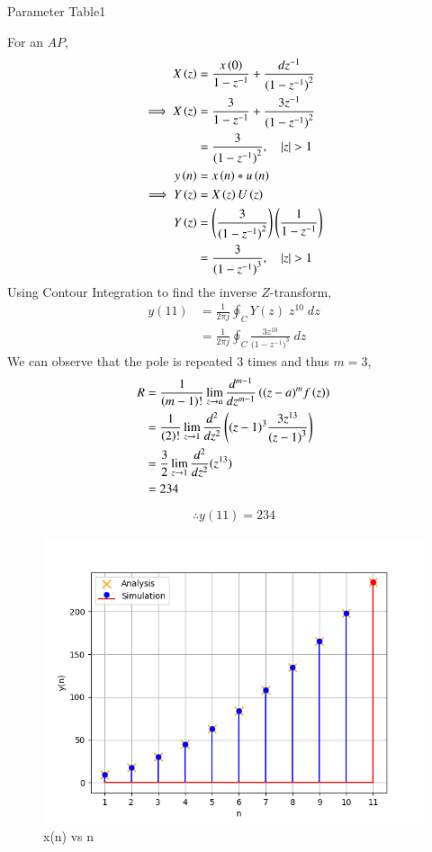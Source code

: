 \documentclass[journal,12pt,twocolumn]{IEEEtran}
\begin{document}
	\begin{table}[ht]
		\centering
		\def\arraystretch{1.5}
		
		\caption{Parameter Table1}
		\label{tab:10.5.3.1}
	\end{table}
	For an $AP$,
	\begin{align}
		X\left(z\right) &= \frac{ x\left(0\right) }{1-z^{-1}} + \frac{dz^{-1}}{{(1-z^{-1})}^{2}}    \\
		\implies X\left(z\right) &= \frac{3}{1-z^{-1}} + \frac{3z^{-1}}{{(1-z^{-1})}^{2}} \\
		&= \frac{3}{({1-z^{-1})}^{2}} ,\quad \left\vert z\right\vert>1    \\
		y\left(n\right)&=x\left(n\right)\ast u\left(n\right)\\
		\implies Y\left(z\right)&=X\left(z\right)U\left(z\right)   \\
		Y\left(z\right)&=\left(\frac{3}{({1-z^{-1})}^{2}}\right)\left(\frac{1}{1-z^{-1}}\right)  \\
		&=\frac{3}{({1-z^{-1})}^{3}} ,\quad \left\vert z\right\vert>1 
	\end{align}
	Using Contour Integration to find the inverse $Z$-transform,
	\begin{align}
		y(11)&=\frac{1}{2\pi j}\oint_{C}Y(z) \;z^{10} \;dz  \\
		&=\frac{1}{2\pi j}\oint_{C}\frac{3z^{10}}{({1-z^{-1})}^{3}} \;dz 
	\end{align}
	We can observe that the pole is repeated $3$ times and thus $m=3$,
	\begin{align}
		R&=\frac{1}{\left(m-1\right)!}\lim\limits_{z\to a}\frac{d^{m-1}}{dz^{m-1}}\left({(z-a)}^{m}f\left(z\right)\right)  \\
		&=\frac{1}{\left(2\right)!}\lim\limits_{z\to 1}\frac{d^{2}}{dz^{2}}\left({(z-1)}^{3}\frac{3z^{13}}{{(z-1)}^3}\right)   \\
		&=\frac{3}{2}\lim\limits_{z\to 1}\frac{d^2}{dz^2}(z^{13})   \\
		&=234
	\end{align}
	\begin{align}
		\therefore \boxed{y(11)=234}
	\end{align}
		\begin{figure}[ht]
		\includegraphics[width = \linewidth]{figs/fig2}
		\caption{x(n) vs n}
		\centering
		\label{fig: fig2}
	\end{figure}
\end{document}
